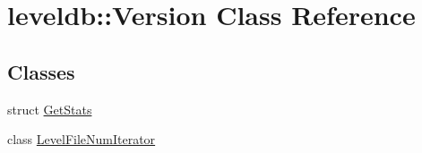 \hypertarget{classleveldb_1_1_version}{}\section{leveldb\+:\+:Version Class Reference}
\label{classleveldb_1_1_version}
\subsection*{Classes}
\begin{DoxyCompactItemize}
\item 
struct \mbox{\hyperlink{structleveldb_1_1_version_1_1_get_stats}{Get\+Stats}}
\item 
class \mbox{\hyperlink{classleveldb_1_1_version_1_1_level_file_num_iterator}{Level\+File\+Num\+Iterator}}
\end{DoxyCompactItemize}
